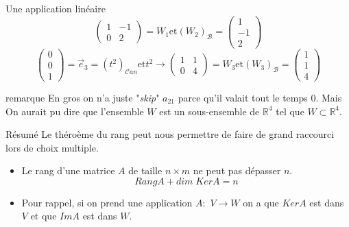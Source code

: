 \begin{parag}{Une application linéaire}
\[\begin{pmatrix}
         1 & -1 \\ 0 & 2
     \end{pmatrix} = W_1 \text{et} \left(W_2\right)_{\mathcal{B}} = \begin{pmatrix}
         1 \\ -1 \\ 2
     \end{pmatrix}\]
     \[\begin{pmatrix}
         0 \\ 0 \\ 1
     \end{pmatrix} = \vec{e}_3 = \left(t^2\right)_{\mathcal{C}an} \text{et} t^2 \to \begin{pmatrix}
         1 & 1 \\ 0 & 4
     \end{pmatrix} = W_3 \text{et} \left(W_3\right)_{\mathcal{B}} = \begin{pmatrix}
         1 \\ 1 \\ 4
     \end{pmatrix}\]
     \begin{subparag}{remarque}
         En gros on n'a juste "\textit{skip}" $a_{21}$ parce qu'il valait tout le temps $0$. Mais On aurait pu dire que l'ensemble $W$ est un sous-ensemble de $\mathbb{R}^4$ tel que $W \subset \mathbb{R}^4$.
     \end{subparag}
 \end{parag}

 \begin{parag}{Résumé}
     Le théroème du rang peut nous permettre de faire de grand raccourci lors de choix multiple.
     \begin{itemize}
         \item Le rang d'une matrice $A$ de taille $n \times m$ ne peut pas dépasser $n$.
         \[Rang  A + dim\; KerA = n\]
         \item Pour rappel, si on prend une application $A :$ $V \to W$ on a que $Ker A$ est dans $V$ et que $Im A$ est dans $W$.                               
     \end{itemize}
 \end{parag}